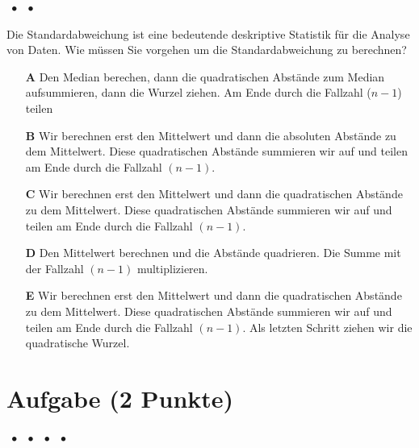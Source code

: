 \documentclass[a4paper, 9pt]{scrartcl}\usepackage[]{graphicx}\usepackage[]{xcolor}
\begin{document}
\ifcollection
\begin{flushright}
\tiny\vspace{-2Ex}
\textbf{\examinhaltstart}
\exammodulemathstat $\;\bullet$
\exammodulestat $\;\bullet$
\exammodulestatbbv 
\vspace{-1Ex}
\end{flushright}
\fi




Die Standardabweichung ist eine bedeutende deskriptive Statistik für die Analyse von Daten. Wie müssen Sie vorgehen um die Standardabweichung zu berechnen?



\begin{enumerate}
\item [\textbf{A} \msquare] Den Median berechen, dann die quadratischen Abstände zum Median aufsummieren, dann die Wurzel ziehen. Am Ende durch die Fallzahl ($n-1$) teilen
\item [\textbf{B} \msquare] Wir berechnen erst den Mittelwert und dann die absoluten Abstände zu dem Mittelwert. Diese quadratischen Abstände summieren wir auf und teilen am Ende durch die Fallzahl $(n-1)$.
\item [\textbf{C} \msquare] Wir berechnen erst den Mittelwert und dann die quadratischen Abstände zu dem Mittelwert. Diese quadratischen Abstände summieren wir auf und teilen am Ende durch die Fallzahl $(n-1)$.
\item [\textbf{D} \msquare] Den Mittelwert berechnen und die Abstände quadrieren. Die Summe mit der Fallzahl $(n-1)$ multiplizieren.
\item [\textbf{E} \msquare] Wir berechnen erst den Mittelwert und dann die quadratischen Abstände zu dem Mittelwert. Diese quadratischen Abstände summieren wir auf und teilen am Ende durch die Fallzahl $(n-1)$. Als letzten Schritt ziehen wir die quadratische Wurzel.
\end{enumerate} 

\section{Aufgabe \hfill (2 Punkte)}

\ifcollection
\begin{flushright}
\tiny\vspace{-2Ex}
\textbf{\examinhaltstart}
\exammodulemathstat $\;\bullet$
\exammodulestat $\;\bullet$
\exammodulestatbbv $\;\bullet$
\exammodulestatversuch $\;\bullet$
\exammodulebiostat
\vspace{-1Ex}
\end{flushright}
\fi
\end{document}
